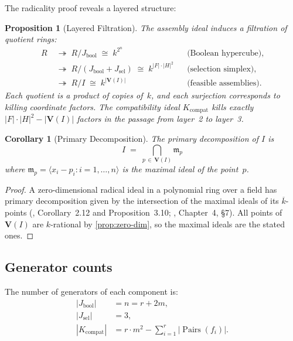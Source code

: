 \documentclass[preprint,12pt]{elsarticle}
\newtheorem{corollary}[theorem]{Corollary}
\newtheorem{proposition}[theorem]{Proposition}
\theoremstyle{definition}
\theoremstyle{remark}
\newcommand{\kk}{k}
\newcommand{\Var}{\mathbf{V}}
\DeclareMathOperator{\Pairs}{Pairs}
\begin{document}
The radicality proof reveals a layered structure:

\begin{proposition}[Layered Filtration]\label{prop:filtration}
The assembly ideal induces a filtration of quotient rings:
\begin{align*}
  R &\;\twoheadrightarrow\; R/J_{\mathrm{bool}} \;\cong\; \kk^{2^n}
    &&\text{(Boolean hypercube)}, \\
  &\;\twoheadrightarrow\; R/(J_{\mathrm{bool}} + J_{\mathrm{sel}})
    \;\cong\; \kk^{|F| \cdot |H|^2}
    &&\text{(selection simplex)}, \\
  &\;\twoheadrightarrow\; R/I \;\cong\; \kk^{|\Var(I)|}
    &&\text{(feasible assemblies)}.
\end{align*}
Each quotient is a product of copies of~$\kk$, and each surjection
corresponds to killing coordinate factors.  The compatibility ideal
$K_{\mathrm{compat}}$ kills exactly $|F| \cdot |H|^2 - |\Var(I)|$
factors in the passage from layer~2 to layer~3.
\end{proposition}

\begin{corollary}[Primary Decomposition]\label{cor:primary}
The primary decomposition of $I$ is
\[
  I \;=\; \bigcap_{p \,\in\, \Var(I)} \mathfrak{m}_p
\]
where $\mathfrak{m}_p = \langle x_i - p_i : i = 1, \ldots, n \rangle$
is the maximal ideal of the point~$p$.
\end{corollary}

\begin{proof}
A zero-dimensional radical ideal in a polynomial ring over a
field has primary decomposition given by the intersection of the
maximal ideals of its $\overline{\kk}$-points
(\cite{Eisenbud95}, Corollary~2.12 and Proposition~3.10;
\cite{CLO15}, Chapter~4, \S7).  All points of $\Var(I)$ are
$\kk$-rational by \cref{prop:zero-dim}, so the maximal ideals
are the stated ones.
\end{proof}


\subsection{Generator counts}

The number of generators of each component is:
\begin{align*}
  |J_{\mathrm{bool}}| &= n = r + 2m, \\
  |J_{\mathrm{sel}}|  &= 3, \\
  |K_{\mathrm{compat}}| &= r \cdot m^2 - \sum_{i=1}^r |\Pairs(f_i)|.
\end{align*}
\end{document}
